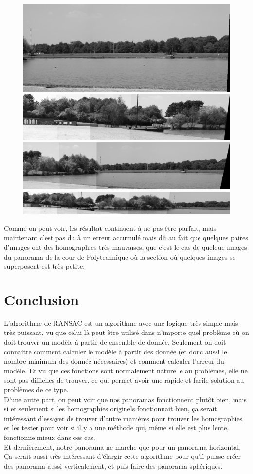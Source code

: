 \documentclass[11pt]{article}
\begin{document}
\begin{figure}[H]
\includegraphics[width=.2\textwidth]{../resources/output/binary_panorama_selected3.jpg}
\includegraphics[width=.4\textwidth]{../resources/output/binary_panorama_selected4.jpg}
\includegraphics[width=.4\textwidth]{../resources/output/binary_panorama_selected5.jpg}
\includegraphics[width=.8\textwidth]{../resources/output/binary_panorama_selected6.jpg}
\end{figure}

Comme on peut voir, les résultat continuent à ne pas être parfait, mais maintenant c’est pas du à un erreur accumulé mais dû au fait que quelques paires d’images ont des homographies très mauvaises, que c’est le cas de quelque images du panorama de la cour de Polytechnique où la section où quelques images se superposent est très petite.

\section{Conclusion}

L’algorithme de RANSAC est un algorithme avec une logique très simple mais très puissant, vu que celui là peut être utilisé dans n’importe quel problème où on doit trouver un modèle à partir de ensemble de donnée. Seulement on doit connaitre comment calculer le modèle à partir des donnée (et donc aussi le nombre minimum des donnée nécessaires) et comment calculer l’erreur du modèle. Et vu que ces fonctions sont normalement naturelle au problèmes, elle ne sont pas difficiles de trouver, ce qui permet avoir une rapide et facile solution au problèmes de ce type. \\
D’une autre part, on peut voir que nos panoramas fonctionnent plutôt bien, mais si et seulement si les homographies originels fonctionnait bien, ça serait intéressant d’essayer de trouver d’autre manières pour trouver les homographies et les tester pour voir si il y a une méthode qui, même si elle est plus lente, fonctionne mieux dans ces cas. \\
Et dernièrement, notre panorama ne marche que pour un panorama horizontal. Ça serait aussi très intéressant d'élargir cette algorithme pour qu’il puisse créer des panorama aussi verticalement, et puis faire des panorama sphériques.  
\end{document}

